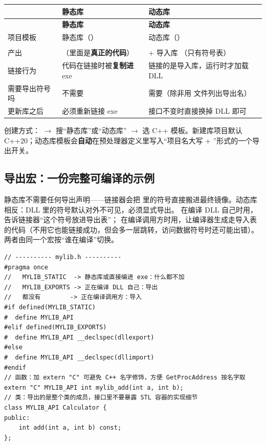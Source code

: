 {\begin{longtable}{L{4.4cm}L{5.2cm}L{5.0cm}}
\toprule
 & \textbf{静态库} & \textbf{动态库} \\
\midrule
\endfirsthead
\toprule
 & \textbf{静态库} & \textbf{动态库} \\
\midrule
\endhead
\bottomrule
\endlastfoot
项目模板 & 静态库（） & 动态库（） \\
 &  &  \\
产出 & （里面是\textbf{真正的代码}） &  + 导入库 （只有符号表） \\
链接行为 & 代码在链接时被\textbf{复制进} exe & 链接的是导入库，运行时才加载 DLL \\
需要导出符号吗 & 不需要 & 需要（除非用  文件列出导出名） \\
更新库之后 & 必须重新链接 exe & 接口不变时直接换掉 DLL 即可 \\
\end{longtable}

创建方式： $\rightarrow$ 搜“静态库”或“动态库” $\rightarrow$ 选 C++ 模板。新建库项目默认 C++20；动态库模板会\textbf{自动}在预处理器定义里写入“项目名大写 + ”形式的一个导出开关。

\subsection{导出宏：一份完整可编译的示例}

静态库不需要任何导出声明——链接器会把  里的符号直接搬进最终镜像。动态库相反：DLL 里的符号默认对外不可见，必须显式导出。 在编译 DLL 自己时用，告诉链接器“这个符号放进导出表”； 在编译调用方时用，让编译器生成走导入表的代码（不用它也能链接成功，但会多一层跳转，访问数据符号时还可能出错）。两者由同一个宏按“谁在编译”切换。

\begin{lstlisting}[style=cppstyle]
// ---------- mylib.h ----------
#pragma once
//   MYLIB_STATIC  -> 静态库或直接编进 exe：什么都不加
//   MYLIB_EXPORTS -> 正在编译 DLL 自己：导出
//   都没有        -> 正在编译调用方：导入
#if defined(MYLIB_STATIC)
#  define MYLIB_API
#elif defined(MYLIB_EXPORTS)
#  define MYLIB_API __declspec(dllexport)
#else
#  define MYLIB_API __declspec(dllimport)
#endif
// 函数：加 extern "C" 可避免 C++ 名字修饰，方便 GetProcAddress 按名字取
extern "C" MYLIB_API int mylib_add(int a, int b);
// 类：导出的是整个类的成员，接口里不要暴露 STL 容器的实现细节
class MYLIB_API Calculator {
public:
    int add(int a, int b) const;
};


\end{lstlisting}}

